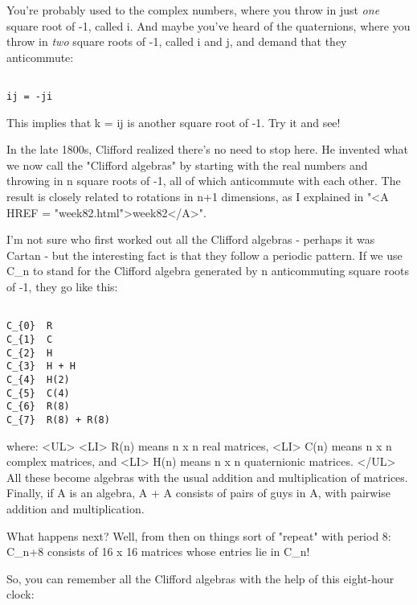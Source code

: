 You're probably used to the complex numbers, where you throw in just 
\emph{one}
square root of -1, called i.  And maybe you've heard of the quaternions, where 
you throw in \emph{two} 
square roots of -1, called i and j, and demand that they
anticommute:


\begin{verbatim}

ij = -ji
\end{verbatim}
    
This implies that k = ij is another square root of -1.   Try it and see!

In the late 1800s, Clifford realized there's no need to stop here.  He invented 
what we now call the "Clifford algebras" by starting with the real numbers and 
throwing in n square roots of -1, all of which anticommute with each other.
The result is closely related to rotations in n+1 dimensions, as I explained in 
"<A HREF = "week82.html">week82</A>".
  
I'm not sure who first worked out all the Clifford algebras - perhaps it was
Cartan - but the interesting fact is that they follow a periodic pattern. 
If we use C_{n} to stand for the Clifford algebra generated by n anticommuting
square roots of -1, they go like this:


\begin{verbatim}

C_{0}  R
C_{1}  C
C_{2}  H
C_{3}  H + H
C_{4}  H(2) 
C_{5}  C(4)
C_{6}  R(8)
C_{7}  R(8) + R(8)
\end{verbatim}
    
where:
<UL>
<LI>
 R(n) means n x n real matrices, 
<LI>
 C(n) means n x n complex matrices, and
<LI>
 H(n) means n x n quaternionic matrices.  
</UL>
All these become algebras with the usual addition and multiplication of 
matrices.  Finally, if A is an algebra, A + A consists of pairs of guys 
in A, with pairwise addition and multiplication.

What happens next?  Well, from then on things sort of "repeat" with period 8: 
C_{n+8} 
consists of 16 x 16 matrices whose entries lie in C_{n}!  

So, you can remember all the Clifford algebras with the help of this 
eight-hour clock:





